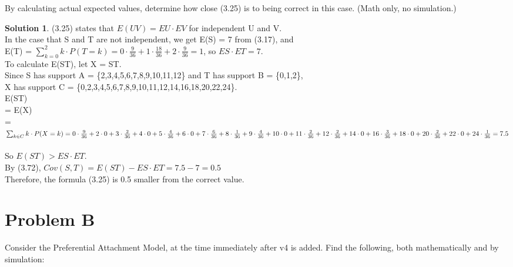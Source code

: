 \documentclass[paper=a4, fontsize=11pt]{scrartcl} %
\numberwithin{equation}{section} %
\numberwithin{figure}{section} %
\numberwithin{table}{section} %
\theoremstyle{definition}
\newtheorem*{solution}{Solution}
\begin{document}
    By calculating actual expected values, determine how close (3.25) is to being correct in this case. (Math only, no simulation.) 
    \begin{solution}
    (3.25) states that $E(UV) = EU \cdot EV$ for independent U and V.\\
    In the case that S and T are not independent, we get E(S) = 7 from (3.17), and\\
    E(T) = $\sum_{k=0}^2 k \cdot P(T = k) = 0 \cdot \frac{9}{36} + 1 \cdot \frac{18}{36} + 2 \cdot \frac{9}{36} = 1$, so $ES \cdot ET = 7$.\\
    To calculate E(ST), let X = ST.\\
    Since S has support A = \{2,3,4,5,6,7,8,9,10,11,12\} and T has support B = \{0,1,2\},\\
    X has support C = \{0,2,3,4,5,6,7,8,9,10,11,12,14,16,18,20,22,24\}.\\
    E(ST)\\
    = E(X)\\
    = $\sum_{k \in C} k \cdot P(X = k)\\
    = 0 \cdot \frac{9}{36} + 2 \cdot 0 + 3 \cdot \frac{2}{36} + 4 \cdot 0 + 5 \cdot \frac{4}{36} + 6 \cdot 0 + 7 \cdot \frac{6}{36} + 8 \cdot \frac{1}{36} + 9 \cdot \frac{4}{36} + 10 \cdot 0 + 11 \cdot \frac{2}{36} + 12 \cdot \frac{2}{36} + 14 \cdot 0 + 16 \cdot \frac{3}{36} + 18 \cdot 0 + 20 \cdot \frac{2}{36} + 22 \cdot 0 + 24 \cdot \frac{1}{36}\\
    = 7.5$\\\\
    So $ E(ST)> ES \cdot ET$.\\
    By (3.72), $Cov(S,T) = E(ST) - ES \cdot ET = 7.5 - 7 = 0.5$\\
    Therefore, the formula (3.25) is 0.5 smaller from the correct value.
    \end{solution}

\section{Problem B}
    Consider the Preferential Attachment Model, at the time immediately after v4 is added. Find the following, both mathematically and by simulation:\\
    
\end{document}
